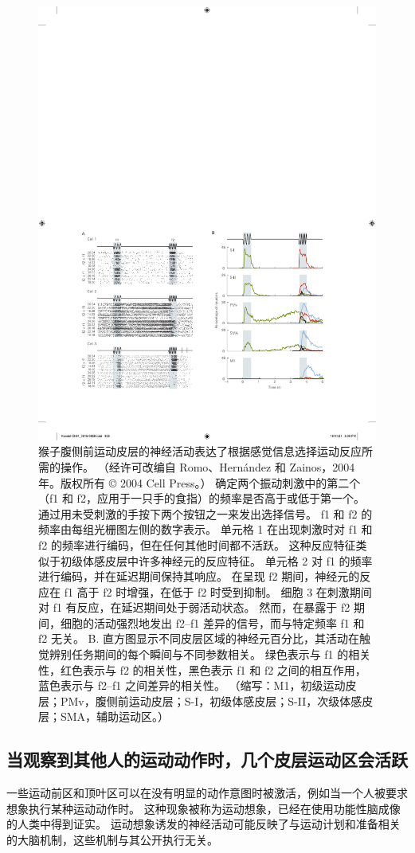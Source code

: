 \begin{figure}[htbp]
	\centering
	\includegraphics[width=0.5\linewidth]{chap34/fig_34_13}
	\caption{猴子腹侧前运动皮层的神经活动表达了根据感觉信息选择运动反应所需的操作。 （经许可改编自 Romo、Hernández 和 Zainos，2004 年。版权所有 © 2004 Cell Press。） 确定两个振动刺激中的第二个（f1 和 f2，应用于一只手的食指）的频率是否高于或低于第一个。 通过用未受刺激的手按下两个按钮之一来发出选择信号。 f1 和 f2 的频率由每组光栅图左侧的数字表示。 单元格 1 在出现刺激时对 f1 和 f2 的频率进行编码，但在任何其他时间都不活跃。 这种反应特征类似于初级体感皮层中许多神经元的反应特征。 单元格 2 对 f1 的频率进行编码，并在延迟期间保持其响应。 在呈现 f2 期间，神经元的反应在 f1 高于 f2 时增强，在低于 f2 时受到抑制。 细胞 3 在刺激期间对 f1 有反应，在延迟期间处于弱活动状态。 然而，在暴露于 f2 期间，细胞的活动强烈地发出 f2–f1 差异的信号，而与特定频率 f1 和 f2 无关。 B. 直方图显示不同皮层区域的神经元百分比，其活动在触觉辨别任务期间的每个瞬间与不同参数相关。 绿色表示与 f1 的相关性，红色表示与 f2 的相关性，黑色表示 f1 和 f2 之间的相互作用，蓝色表示与 f2–f1 之间差异的相关性。 （缩写：M1，初级运动皮层；PMv，腹侧前运动皮层；S-I，初级体感皮层；S-II，次级体感皮层；SMA，辅助运动区。）}
	\label{fig:34_13}
\end{figure}


\subsection{当观察到其他人的运动动作时，几个皮层运动区会活跃}
一些运动前区和顶叶区可以在没有明显的动作意图时被激活，例如当一个人被要求想象执行某种运动动作时。 这种现象被称为运动想象，已经在使用功能性脑成像的人类中得到证实。 运动想象诱发的神经活动可能反映了与运动计划和准备相关的大脑机制，这些机制与其公开执行无关。

